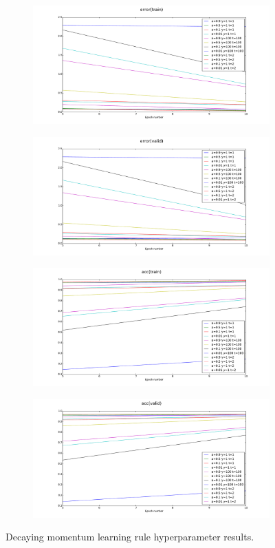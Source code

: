 \documentclass[12pt]{article}
\begin{document}
\begin{figure}[h]
\centering
\begin{subfigure}{.5\textwidth}
  \centering
  \includegraphics[width=9.1cm]{Task2/figures/Mome_var_error(train).pdf}
\end{subfigure}%
\begin{subfigure}{.5\textwidth}
  \centering
  \includegraphics[width=9.1cm]{Task2/figures/Mome_var_error(valid).pdf}
\end{subfigure}%
\end{figure}
\begin{figure}[h]
\centering
\begin{subfigure}{.5\textwidth}
  \centering
  \includegraphics[width=9.1cm]{Task2/figures/Mome_var_acc(train).pdf}
\end{subfigure}%
\begin{subfigure}{.5\textwidth}
  \centering
  \includegraphics[width=9.1cm]{Task2/figures/Mome_var_acc(valid).pdf}
\end{subfigure}%
  \caption{Decaying momentum learning rule hyperparameter results.}
  \label{fig:mome_var}
  
\end{figure}
\end{document}
